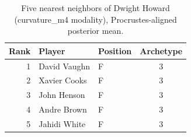 \begin{table}[htbp]
  \centering\small
  \begin{tabular}{rllc}
    \toprule
    Rank & Player & Position & Archetype \\
    \midrule
    1 & David Vaughn & F & 3 \\
    2 & Xavier Cooks & F & 3 \\
    3 & John Henson & F & 3 \\
    4 & Andre Brown & F & 3 \\
    5 & Jahidi White & F & 3 \\
    \bottomrule
  \end{tabular}
  \caption{Five nearest neighbors of Dwight Howard (curvature_m4 modality), Procrustes-aligned posterior mean.}
  \label{tab:Dwight_Howard_neighbors_curvature_m4}
\end{table}

